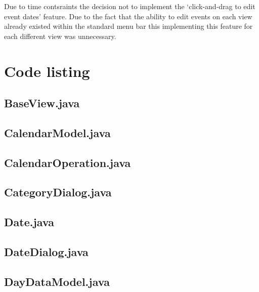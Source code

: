 \documentclass{article}
\begin{document}
Due to time contsraints the decision not to implement the
`click-and-drag to edit event dates' feature. Due to the fact that the
ability to edit events on each view already existed within the standard
menu bar this implementing this feature for each different view was
unnecessary.


\appendix

\section{Code listing}

\subsection{BaseView.java}



\subsection{CalendarModel.java}



\subsection{CalendarOperation.java}



\subsection{CategoryDialog.java}



\subsection{Date.java}



\subsection{DateDialog.java}



\subsection{DayDataModel.java}
\end{document}
